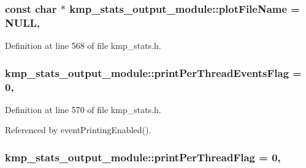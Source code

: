 \hypertarget{classkmp__stats__output__module_ab28d6e78e962dd887f82a6733d82b0ab}{
\subsubsection[{plot\-File\-Name}]{\setlength{\rightskip}{0pt plus 5cm}const char $\ast$ kmp\-\_\-stats\-\_\-output\-\_\-module\-::plot\-File\-Name = N\-U\-L\-L\hspace{0.3cm}{\ttfamily [static]}, {\ttfamily [private]}}}\label{classkmp__stats__output__module_ab28d6e78e962dd887f82a6733d82b0ab}


Definition at line 568 of file kmp\-\_\-stats.\-h.

\hypertarget{classkmp__stats__output__module_abfc8ceea0aeda3190a597aa12b1594e8}{
\subsubsection[{print\-Per\-Thread\-Events\-Flag}]{ kmp\-\_\-stats\-\_\-output\-\_\-module\-::print\-Per\-Thread\-Events\-Flag = 0\hspace{0.3cm}{\ttfamily [static]}, {\ttfamily [private]}}}\label{classkmp__stats__output__module_abfc8ceea0aeda3190a597aa12b1594e8}


Definition at line 570 of file kmp\-\_\-stats.\-h.



Referenced by event\-Printing\-Enabled().

\hypertarget{classkmp__stats__output__module_adfe5f484599e868c3695086fa3618640}{
\subsubsection[{print\-Per\-Thread\-Flag}]{ kmp\-\_\-stats\-\_\-output\-\_\-module\-::print\-Per\-Thread\-Flag = 0\hspace{0.3cm}{\ttfamily [static]}, {\ttfamily [private]}}}\label{classkmp__stats__output__module_adfe5f484599e868c3695086fa3618640}


